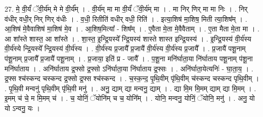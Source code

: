 \documentclass[17pt]{extarticle}
\begin{document}
27. मे॒ वी॒र्यं॑ ॅवी॒र्य॑म् मे मे वी॒र्य᳚म् । . वी॒र्य॑म् मा मा वी॒र्यं॑ ॅवी॒र्य॑म् मा । . मा निर् णिर् मा मा निः । . निर् व॑धीर् वधी॒र् निर् णिर् व॑धीः । . व॒धी॒ रितीति॑ वधीर् वधी॒ रिति॑ । . इत्या॒शिष॑ मा॒शिष॒ मिती त्या॒शिष᳚म् । . आ॒शिष॑ मे॒वैवाशिष॑ मा॒शिष॑ मे॒व । . आ॒शिष॒मित्या᳚ - शिष᳚म् । . ए॒वैता मे॒ता मे॒वैवैताम् । . ए॒ता मैता मे॒ता मा । . आ शा᳚स्ते शास्त॒ आ शा᳚स्ते । . शा॒स्त॒ इ॒न्द्रि॒यस्ये᳚ न्द्रि॒यस्य॑ शास्ते शास्त इन्द्रि॒यस्य॑ । . इ॒न्द्रि॒यस्य॑ वी॒र्य॑स्य वी॒र्य॑स्ये न्द्रि॒यस्ये᳚ न्द्रि॒यस्य॑ वी॒र्य॑स्य । . वी॒र्य॑स्य प्र॒जायै᳚ प्र॒जायै॑ वी॒र्य॑स्य वी॒र्य॑स्य प्र॒जायै᳚ । . प्र॒जायै॑ पशू॒नाम् प॑शू॒नाम् प्र॒जायै᳚ प्र॒जायै॑ पशू॒नाम् । . प्र॒जाया॒ इति॑ प्र - जायै᳚ । . प॒शू॒ना मनि॑र्घाता॒या नि॑र्घाताय पशू॒नाम् प॑शू॒ना मनि॑र्घाताय । . अनि॑र्घाताय द्र॒फ्सो द्र॒फ्सो ऽनि॑र्घाता॒या नि॑र्घाताय द्र॒फ्सः । . अनि॑र्घाता॒येत्यनिः॑ - घा॒ता॒य॒ । . द्र॒फ्स श्च॑स्कन्द चस्कन्द द्र॒फ्सो द्र॒फ्स श्च॑स्कन्द । . च॒स्क॒न्द॒ पृ॒थि॒वीम् पृ॑थि॒वीम् च॑स्कन्द चस्कन्द पृथि॒वीम् । . पृ॒थि॒वी मन्वनु॑ पृथि॒वीम् पृ॑थि॒वी मनु॑ । . अनु॒ द्याम् द्या मन्वनु॒ द्याम् । . द्या मि॒म मि॒मम् द्याम् द्या मि॒मम् । . इ॒मम् च॑ चे॒ म मि॒मम् च॑ । . च॒ योनिं॒ ॅयोनि॑म् च च॒ योनि᳚म् । . योनि॒ मन्वनु॒ योनिं॒ ॅयोनि॒ मनु॑ । . अनु॒ यो यो ऽन्वनु॒ यः । \newline
\end{document}
